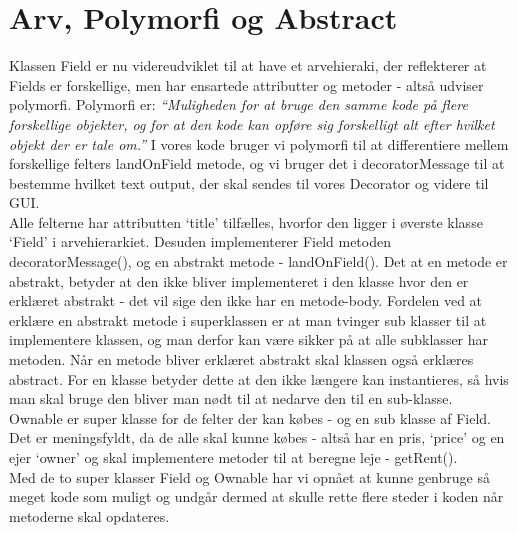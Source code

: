 \section*{Arv, Polymorfi og Abstract}
Klassen Field er nu videreudviklet til at have et arvehieraki, der reflekterer
at Fields er forskellige, men har ensartede attributter og metoder - altså
udviser polymorfi. Polymorfi er: \emph{“Muligheden for at bruge den samme kode på
flere forskellige objekter, og for at den kode kan opføre sig forskelligt alt
efter hvilket objekt der er tale om.”}\cite{buildingJava} I vores kode bruger vi
polymorfi til at differentiere mellem forskellige felters landOnField metode, og
vi bruger det i decoratorMessage til at bestemme hvilket text output, der skal
sendes til vores Decorator og videre til GUI.\\
\indent Alle felterne har attributten ‘title’ tilfælles, hvorfor den ligger i
øverste klasse ‘Field’ i arvehierarkiet. Desuden implementerer Field metoden
decoratorMessage(), og en abstrakt metode - landOnField(). Det at en metode er
abstrakt, betyder at den ikke bliver  implementeret i den klasse hvor den er
erklæret abstrakt - det vil sige den ikke  har en metode-body. Fordelen ved at
erklære en abstrakt metode i superklassen er  at man tvinger sub klasser til at
implementere klassen, og man derfor kan være  sikker på at alle subklasser har
metoden. Når en metode bliver erklæret abstrakt  skal klassen også erklæres
abstract. For en klasse betyder dette at den ikke  længere kan instantieres, så
hvis man skal bruge den bliver man nødt til at  nedarve den til en sub-klasse.\\
\indent Ownable er super klasse for de felter  der kan købes - og en sub klasse
af Field. Det er meningsfyldt, da de alle skal  kunne købes - altså har en pris,
‘price’ og en ejer ‘owner’ og skal implementere  metoder til at beregne leje -
getRent().\\
\indent Med de to super klasser Field og  Ownable har vi opnået at kunne
genbruge så meget kode som muligt og undgår  dermed at skulle rette flere steder
i koden når metoderne skal opdateres.\\
\FloatBarrier
